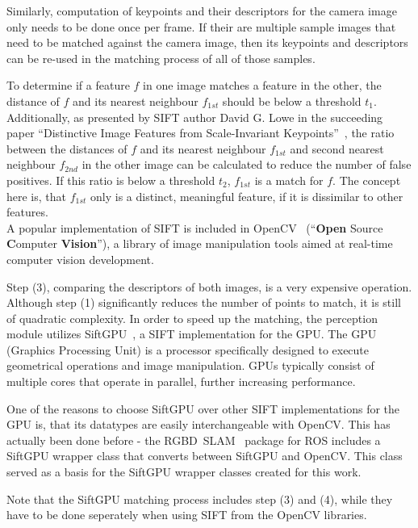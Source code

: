 Similarly, computation of keypoints and their descriptors for the camera image only needs to be done once per frame. If their are multiple sample images that need to be matched against the camera image, then its keypoints and descriptors can be re-used in the matching process of all of those samples.

To determine if a feature $f$ in one image matches a feature in the other, the distance of $f$ and its nearest neighbour $f_{1st}$ should be below a threshold $t_1$. Additionally, as presented by SIFT author David G. Lowe in the succeeding paper ``Distinctive Image Features from Scale-Invariant Keypoints''~\cite{image_features_lowe}, the ratio between the distances of $f$ and its nearest neighbour $f_{1st}$ and second nearest neighbour $f_{2nd}$ in the other image can be calculated to reduce the number of false positives. If this ratio is below a threshold $t_2$, $f_{1st}$ is a match for $f$. The concept here is, that $f_{1st}$ only is a distinct, meaningful feature, if it is dissimilar to other features. \\

A popular implementation of SIFT is included in OpenCV~\cite{opencv_library} (``\textbf{Open} Source \textbf{C}omputer \textbf{Vision}''), a library of image manipulation tools aimed at real-time computer vision development.

Step (3), comparing the descriptors of both images, is a very expensive operation. Although step (1) significantly reduces the number of points to match, it is still of quadratic complexity. In order to speed up the matching, the perception module utilizes SiftGPU~\cite{siftgpu07wu}, a SIFT implementation for the GPU. The GPU (Graphics Processing Unit) is a processor specifically designed to execute geometrical operations and image manipulation. GPUs typically consist of multiple cores that operate in parallel, further increasing performance. 

One of the reasons to choose SiftGPU over other SIFT implementations for the GPU is, that its datatypes are easily interchangeable with OpenCV. This has actually been done before - the RGBD~SLAM~\cite{endres10rgbdslam} package for ROS includes a SiftGPU wrapper class that converts between SiftGPU and OpenCV. This class served as a basis for the SiftGPU wrapper classes created for this work.

Note that the SiftGPU matching process includes step (3) and (4), while they have to be done seperately when using SIFT from the OpenCV libraries.

